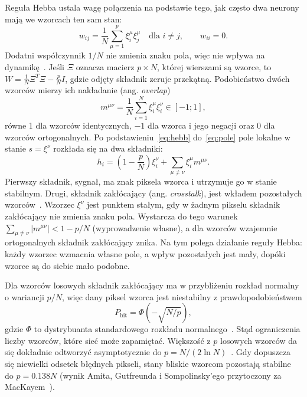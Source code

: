 Reguła Hebba ustala wagę połączenia na podstawie tego, jak często dwa neurony mają we wzorcach ten sam stan:
\begin{equation}
    w_{ij} = \frac{1}{N} \sum_{\mu=1}^{p} \xi^\mu_i \xi^\mu_j \quad \text{dla } i \ne j, \qquad w_{ii} = 0.
    \label{eq:hebb}
\end{equation}
Dodatni współczynnik $1/N$ nie zmienia znaku pola, więc nie wpływa na dynamikę~\cite[s.~318]{rojas1996}. Jeśli $\Xi$ oznacza macierz $p \times N$, której wierszami są wzorce, to $W = \frac{1}{N} \Xi^T \Xi - \frac{p}{N} I$, gdzie odjęty składnik zeruje przekątną.
Podobieństwo dwóch wzorców mierzy ich nakładanie (ang. \textit{overlap})
\begin{equation}
    m^{\mu\nu} = \frac{1}{N} \sum_{i=1}^{N} \xi^\mu_i \xi^\nu_i \in [-1; 1],
    \label{eq:nakladanie}
\end{equation}
równe 1 dla wzorców identycznych, $-1$ dla wzorca i jego negacji oraz 0 dla wzorców ortogonalnych. Po podstawieniu~\eqref{eq:hebb} do~\eqref{eq:pole} pole lokalne w stanie $s = \xi^\nu$ rozkłada się na dwa składniki:
\begin{equation}
    h_i = \left(1 - \frac{p}{N}\right) \xi^\nu_i + \sum_{\mu \ne \nu} \xi^\mu_i m^{\mu\nu}.
    \label{eq:przesluch}
\end{equation}
Pierwszy składnik, sygnał, ma znak piksela wzorca i utrzymuje go w stanie stabilnym. Drugi, składnik zakłócający (ang. \textit{crosstalk}), jest wkładem pozostałych wzorców~\cite[s.~317--318]{rojas1996}. Wzorzec $\xi^\nu$ jest punktem stałym, gdy w żadnym pikselu składnik zakłócający nie zmienia znaku pola. Wystarcza do tego warunek $\sum_{\mu \ne \nu} \lvert m^{\mu\nu} \rvert < 1 - p/N$ (wyprowadzenie własne), a dla wzorców wzajemnie ortogonalnych składnik zakłócający znika. Na tym polega działanie reguły Hebba: każdy wzorzec wzmacnia własne pole, a wpływ pozostałych jest mały, dopóki wzorce są do siebie mało podobne.

Dla wzorców losowych składnik zakłócający ma w przybliżeniu rozkład normalny o wariancji $p/N$, więc dany piksel wzorca jest niestabilny z prawdopodobieństwem
\begin{equation}
    P_\text{bit} = \Phi\left(-\sqrt{N/p}\right),
    \label{eq:p-bit}
\end{equation}
gdzie $\Phi$ to dystrybuanta standardowego rozkładu normalnego~\cite[s.~513]{mackay2003}. Stąd ograniczenia liczby wzorców, które sieć może zapamiętać. Większość z $p$ losowych wzorców da się dokładnie odtworzyć asymptotycznie do $p = N/(2 \ln N)$~\cite[s.~461, 470]{mceliece1987}. Gdy dopuszcza się niewielki odsetek błędnych pikseli, stany bliskie wzorcom pozostają stabilne do $p = \num{0.138} N$ (wynik Amita, Gutfreunda i Sompolinsky'ego przytoczony za MacKayem~\cite[s.~514--515]{mackay2003}).

